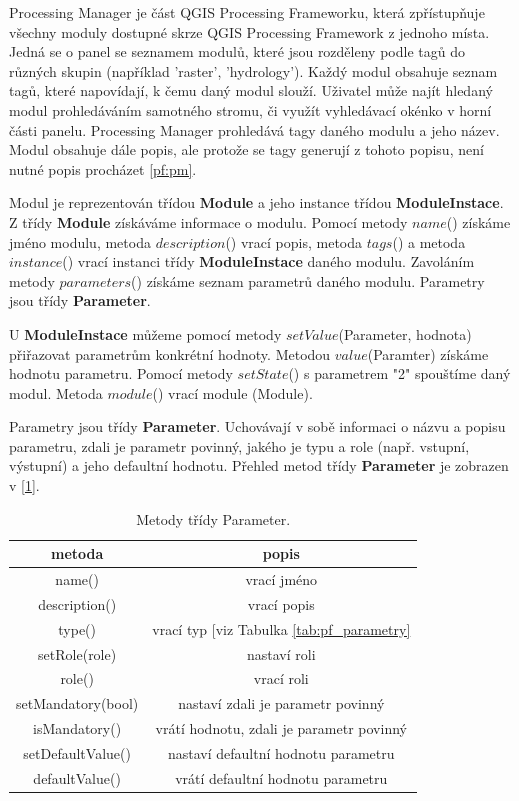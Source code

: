 Processing Manager je část QGIS Processing Frameworku, která zpřístupňuje všechny moduly dostupné skrze QGIS Processing Framework z jednoho místa. Jedná se o panel se seznamem modulů, které jsou rozděleny podle tagů do různých skupin (například 'raster', 'hydrology'). Každý modul obsahuje seznam tagů, které napovídají, k čemu daný modul slouží. Uživatel může najít hledaný modul prohledáváním samotného stromu, či využít vyhledávací okénko v horní části panelu. Processing Manager prohledává tagy daného modulu a jeho název. Modul obsahuje dále popis, ale protože se tagy generují z tohoto popisu, není nutné popis procházet \figurename \ref{pf:pm}.

Modul je reprezentován třídou \textbf{Module} a jeho instance třídou \textbf{ModuleInstace}. Z třídy \textbf{Module} získáváme informace o modulu. Pomocí metody $name$() získáme jméno modulu, metoda $description$() vrací popis, metoda $tags$() a metoda $instance$() vrací instanci třídy \textbf{ModuleInstace} daného modulu. Zavoláním metody $parameters$() získáme seznam parametrů daného modulu. Parametry jsou třídy \textbf{Parameter}.

U \textbf{ModuleInstace} můžeme pomocí metody $setValue$(Parameter, hodnota) přiřazovat parametrům konkrétní hodnoty. Metodou $value$(Paramter) získáme hodnotu parametru. Pomocí metody $setState$() s parametrem "2" spouštíme daný modul. Metoda $module$() vrací module (Module).

Parametry jsou třídy \textbf{Parameter}. Uchovávají v sobě informaci o názvu a popisu parametru, zdali je parametr povinný, jakého je typu a role (např. vstupní, výstupní) a jeho defaultní hodnotu. Přehled metod třídy \textbf{Parameter} je zobrazen v [\tablename \ref{tab:metPar}].

\begin{table}[!]
	\centering
	\begin{tabular}{|c|c|}
	\hline
	metoda & popis \\
	\hline
	\hline
	name() & vrací jméno\\
	description() & vrací popis\\
	type() & vrací typ [viz Tabulka \ref{tab:pf_parametry} \\
	setRole(role) & nastaví roli\\
	role() & vrací roli\\
	setMandatory(bool) & nastaví zdali je parametr povinný\\
	isMandatory() & vrátí hodnotu, zdali je parametr povinný\\
	setDefaultValue() & nastaví defaultní hodnotu parametru\\
	defaultValue() & vrátí defaultní hodnotu parametru \\
	\hline
	\end{tabular}
	\caption{Metody třídy Parameter.}
	\label{tab:metPar}
\end{table}

